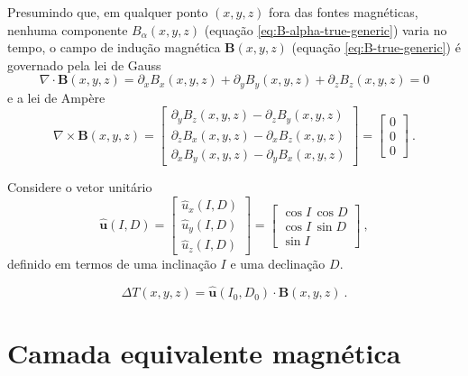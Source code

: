 Presumindo que, em qualquer ponto $(x, y, z)$ fora das fontes magnéticas, nenhuma 
componente $B_{\alpha}(x, y, z)$ (equação \ref{eq:B-alpha-true-generic}) varia no tempo, 
o campo de indução magnética $\mathbf{B}(x, y, z)$ (equação \ref{eq:B-true-generic}) é governado
pela lei de Gauss
\begin{equation}
\nabla \cdot \mathbf{B}(x, y, z) = 
\partial_{x} B_{x}(x, y, z) + \partial_{y} B_{y}(x, y, z) + \partial_{z} B_{z}(x, y, z) = 
0
\label{eq:lei-Gauss}
\end{equation}
e a lei de Ampère
\begin{equation}
\nabla \times \mathbf{B}(x, y, z) = \begin{bmatrix}
\partial_{y} B_{z}(x, y, z) - \partial_{z} B_{y}(x, y, z) \\
\partial_{z} B_{x}(x, y, z) - \partial_{x} B_{z}(x, y, z) \\
\partial_{x} B_{y}(x, y, z) - \partial_{y} B_{x}(x, y, z) 
\end{bmatrix} = 
\begin{bmatrix}
0 \\
0 \\
0
\end{bmatrix} \: .
\label{eq:lei-Ampere}
\end{equation}



Considere o vetor unitário 
\begin{equation}
\hat{\mathbf{u}}(I, D) = 
\begin{bmatrix}
\hat{u}_{x}(I, D) \\
\hat{u}_{y}(I, D) \\
\hat{u}_{z}(I, D) 
\end{bmatrix} = 
\begin{bmatrix}
\cos I \, \cos D \\
\cos I \, \sin D \\
\sin I
\end{bmatrix} \: ,
\label{eq:u-hat}
\end{equation}
definido em termos de uma inclinação $I$ e uma declinação $D$.


\begin{equation}
\Delta T(x, y, z) = \hat{\mathbf{u}}(I_{0}, D_{0}) \cdot \mathbf{B}(x, y, z) \: .
\label{eq:Delta-T-true}
\end{equation}


\section{Camada equivalente magnética}
\label{sec:camada-equivalente}


